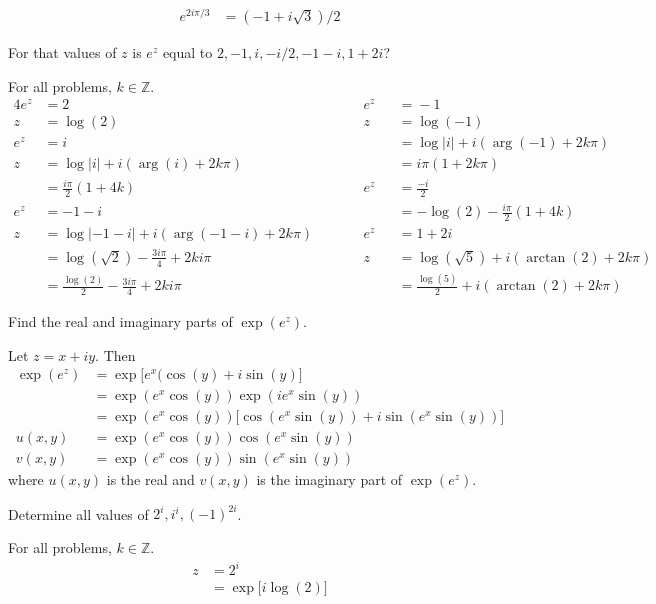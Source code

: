 \begin{exercise}
\begin{align*}
    e^{2i\pi/3} & = (-1 + i\sqrt{3})/2
  \end{align*}
\item
  For that values of \(z\) is \(e^z\) equal to \(2,-1,i,-i/2,-1 - i,1 + 2i\)?
  \par\smallskip
  For all problems, \(k\in\mathbb{Z}\).
  \begin{alignat*}{4}
    e^z & = 2 & \qquad & e^z && ={} -1\\
    z & = \log(2) & & z && ={} \log(-1)\\
    e^z & = i & & && ={}\log\lvert i\rvert + i(\arg(-1) + 2k\pi)\\
    z & = \log\lvert i\rvert + i(\arg(i) + 2k\pi) & & && = {} i\pi(1 + 2k\pi)\\
    & = \frac{i\pi}{2}(1 + 4k) & & e^z && = \frac{-i}{2}\\
    e^z & = -1 - i & & && = -\log(2) - \frac{i\pi}{2}(1 + 4k)\\
    z & = \log\lvert -1 - i\rvert + i(\arg(-1 - i) + 2k\pi) & &
    e^z && ={} 1 + 2i\\
    & = \log(\sqrt{2}) - \frac{3i\pi}{4} + 2ki\pi & & z
    && ={} \log(\sqrt{5}) + i(\arctan(2) + 2k\pi)\\
    & = \frac{\log(2)}{2} - \frac{3i\pi}{4} + 2ki\pi & &
    && ={} \frac{\log(5)}{2} + i(\arctan(2) + 2k\pi)
  \end{alignat*}
\item
  Find the real and imaginary parts of \(\exp(e^z)\).
  \par\smallskip
  Let \(z = x + iy\).
  Then
  \begin{align*}
    \exp(e^z) & = \exp\bigl[e^x(\cos(y) + i\sin(y)\bigr]\\
              & = \exp(e^x\cos(y))\exp(ie^x\sin(y))\\
              & = \exp(e^x\cos(y))
                \bigl[\cos(e^x\sin(y)) + i\sin(e^x\sin(y))\bigr]\\
    u(x, y) & = \exp(e^x\cos(y))\cos(e^x\sin(y))\\
    v(x, y) & = \exp(e^x\cos(y))\sin(e^x\sin(y))
  \end{align*}
  where \(u(x,y)\) is the real and \(v(x,y)\) is the imaginary part of
  \(\exp(e^z)\).
\item
  Determine all values of \(2^i,i^i,(-1)^{2i}\).
  \par\smallskip
  For all problems, \(k\in\mathbb{Z}\).
  \begin{align*}
    z & = 2^i\\
      & = \exp\bigl[i\log(2)\bigr]\\

\end{align*}
\end{exercise}
